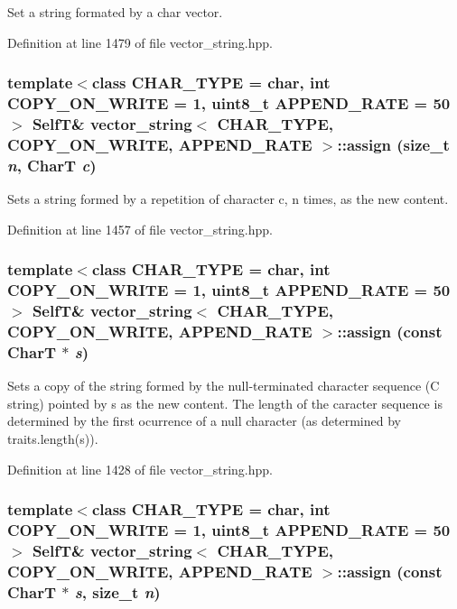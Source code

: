 Set a string formated by a char vector. 

Definition at line 1479 of file vector\_\-string.hpp.\hypertarget{classvector__string_ea3113685a1ba396a16bd076ea95a97a}{
\subsubsection[{assign}]{\setlength{\rightskip}{0pt plus 5cm}template$<$class CHAR\_\-TYPE  = char, int COPY\_\-ON\_\-WRITE = 1, uint8\_\-t APPEND\_\-RATE = 50$>$ {\bf SelfT}\& {\bf vector\_\-string}$<$ CHAR\_\-TYPE, COPY\_\-ON\_\-WRITE, APPEND\_\-RATE $>$::assign (size\_\-t {\em n}, \/  CharT {\em c})}}
\label{classvector__string_ea3113685a1ba396a16bd076ea95a97a}


Sets a string formed by a repetition of character c, n times, as the new content. 

Definition at line 1457 of file vector\_\-string.hpp.\hypertarget{classvector__string_34c0ca4e69795856ed1b31c67c72ffff}{
\subsubsection[{assign}]{\setlength{\rightskip}{0pt plus 5cm}template$<$class CHAR\_\-TYPE  = char, int COPY\_\-ON\_\-WRITE = 1, uint8\_\-t APPEND\_\-RATE = 50$>$ {\bf SelfT}\& {\bf vector\_\-string}$<$ CHAR\_\-TYPE, COPY\_\-ON\_\-WRITE, APPEND\_\-RATE $>$::assign (const CharT $\ast$ {\em s})}}
\label{classvector__string_34c0ca4e69795856ed1b31c67c72ffff}


Sets a copy of the string formed by the null-terminated character sequence (C string) pointed by s as the new content. The length of the caracter sequence is determined by the first ocurrence of a null character (as determined by traits.length(s)). 

Definition at line 1428 of file vector\_\-string.hpp.\hypertarget{classvector__string_6122c21fde4b8731e4eba761b1803900}{
\subsubsection[{assign}]{\setlength{\rightskip}{0pt plus 5cm}template$<$class CHAR\_\-TYPE  = char, int COPY\_\-ON\_\-WRITE = 1, uint8\_\-t APPEND\_\-RATE = 50$>$ {\bf SelfT}\& {\bf vector\_\-string}$<$ CHAR\_\-TYPE, COPY\_\-ON\_\-WRITE, APPEND\_\-RATE $>$::assign (const CharT $\ast$ {\em s}, \/  size\_\-t {\em n})}}
\label{classvector__string_6122c21fde4b8731e4eba761b1803900}


